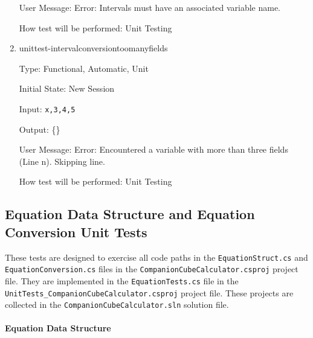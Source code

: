 \documentclass[12pt, titlepage]{article}
\begin{document}
\begin{enumerate}
	User Message: Error: Intervals must have an associated variable name.
	
	How test will be performed: Unit Testing\\
	
	\item{unittest-intervalconversiontoomanyfields}
	
	Type: Functional, Automatic, Unit
	
	Initial State: New Session
	
	Input: \texttt{x,3,4,5}
	
	Output: \{\}
	
	User Message: Error: Encountered a variable with more than three fields 
	(Line n). Skipping line.
	
	How test will be performed: Unit Testing\\
	
\end{enumerate}

\subsection{Equation Data Structure and Equation Conversion Unit Tests}
These tests are designed to exercise all code paths in the 
\texttt{EquationStruct.cs} and \texttt{EquationConversion.cs} 
files in the \texttt{CompanionCubeCalculator.csproj} project file. They are 
implemented in the \texttt{EquationTests.cs} file in the \\
\texttt{UnitTests\_CompanionCubeCalculator.csproj} project file. These projects 
are collected in the \texttt{CompanionCubeCalculator.sln} solution file.

\paragraph{Equation Data Structure}
\end{document}
